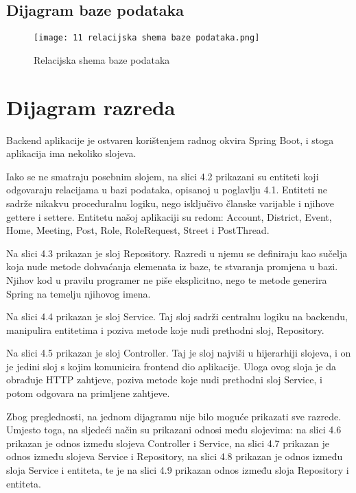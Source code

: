 							
							
			\eject	
			
			\subsection{Dijagram baze podataka}
	\begin{figure}[h]
	\centering
  \hbox{\hspace{-2.2cm}\texttt{[image: 11 relacijska shema baze podataka.png]}}
  \caption{Relacijska shema baze podataka}
  \label{Relacijska_shema}
\end{figure}
			
			\eject
			
		\section{Dijagram razreda}
		
		Backend aplikacije je ostvaren korištenjem radnog okvira Spring Boot, i stoga aplikacija ima nekoliko slojeva.
		
		Iako se ne smatraju posebnim slojem, na slici 4.2 prikazani su entiteti koji odgovaraju relacijama u bazi podataka, opisanoj u poglavlju 4.1. Entiteti ne sadrže nikakvu proceduralnu logiku, nego isključivo članske varijable i njihove gettere i settere. Entitetu našoj aplikaciji su redom: Account, District, Event, Home, Meeting, Post, Role, RoleRequest, Street i PostThread.
		
		Na slici 4.3 prikazan je sloj Repository. Razredi u njemu se definiraju kao sučelja koja nude metode dohvaćanja elemenata iz baze, te stvaranja promjena u bazi. Njihov kod u pravilu programer ne piše eksplicitno, nego te metode generira Spring na temelju njihovog imena.
		
		Na slici 4.4 prikazan je sloj Service. Taj sloj sadrži centralnu logiku na backendu, manipulira entitetima i poziva metode koje nudi prethodni sloj, Repository.
		
		Na slici 4.5 prikazan je sloj Controller. Taj je sloj najviši u hijerarhiji slojeva, i on je jedini sloj s kojim komunicira frontend dio aplikacije. Uloga ovog sloja je da obrađuje HTTP zahtjeve, poziva metode koje nudi prethodni sloj Service, i potom odgovara na primljene zahtjeve.
		
		Zbog preglednosti, na jednom dijagramu nije bilo moguće prikazati sve razrede. Umjesto toga, na sljedeći način su prikazani odnosi među slojevima: na slici 4.6 prikazan je odnos između slojeva Controller i Service, na slici 4.7 prikazan je odnos između slojeva Service i Repository, na slici 4.8 prikazan je odnos između sloja Service i entiteta, te je na slici 4.9 prikazan odnos između sloja Repository i entiteta.
		
